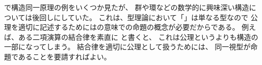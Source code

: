 \documentclass[index]{subfiles}
\begin{document}

で構造同一原理の例をいくつか見たが、
群や環などの数学的に興味深い構造については後回しにしていた。
これは、型理論において「」は単なる型なので
公理を適切に記述するためにはの意味での命題の概念が必要だからである。
例えば、ある二項演算\myInlineMath{\times}の結合律を素直に
と書くと、
これは公理というよりも構造の一部になってしまう。
結合律を適切に公理として扱うためには、
同一視型が命題であることを要請すればよい。



\end{document}

